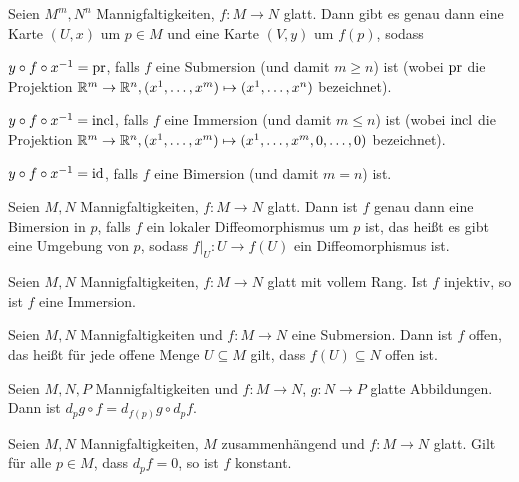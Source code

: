 \begin{korollar}[Normalformensatz]
  Seien $M^m,N^n$ Mannigfaltigkeiten, $f\colon M \to N$ glatt. Dann gibt
  es genau dann eine Karte $(U,x)$ um $p\in M$ und eine Karte $(V,y)$ um $f(p)$, sodass
  \begin{statements}
  \item $y\circ f\circ x^{-1} = \operatorname{pr}$, falls $f$ eine Submersion (und
    damit $m\geq n$) ist
    (wobei $\operatorname{pr}$ die Projektion $\mathbb{R}^m\to\mathbb{R}^n, (x^1,\dots,x^m) \mapsto
    (x^1,\dots,x^n)$ bezeichnet).
  \item $y\circ f\circ x^{-1} = \operatorname{incl}$, falls $f$ eine Immersion (und
    damit $m\leq n$) ist
    (wobei $\operatorname{incl}$ die Projektion $\mathbb{R}^m\to\mathbb{R}^n, (x^1,\dots,x^m) \mapsto
    (x^1,\dots,x^m,0,\dots,0)$ bezeichnet).
  \item $y\circ f\circ x^{-1} = \operatorname{id}$, falls $f$ eine Bimersion (und
    damit $m = n$) ist.
  \end{statements}
\end{korollar}

\begin{korollar}[Umkehrsatz]
  Seien $M,N$ Mannigfaltigkeiten, $f\colon M \to N$ glatt. Dann ist
  $f$ genau dann eine Bimersion in $p$, falls $f$ ein lokaler
  Diffeomorphismus um $p$ ist, das heißt es gibt eine Umgebung von
  $p$, sodass $f|_U\colon U \to f(U)$ ein Diffeomorphismus ist. 
\end{korollar}

\begin{proposition}
  Seien $M,N$ Mannigfaltigkeiten, $f\colon M \to N$ glatt mit vollem
  Rang. Ist $f$ injektiv, so ist $f$ eine Immersion.
\end{proposition}

\begin{proposition}
  Seien $M,N$ Mannigfaltigkeiten und $f\colon M \to N$ eine
  Submersion. Dann ist $f$ offen, das heißt für jede offene Menge
  $U\subseteq M$ gilt, dass $f(U) \subseteq N$ offen ist.
\end{proposition}

\begin{proposition}
  Seien $M,N,P$ Mannigfaltigkeiten und $f\colon M\to N$, $g\colon N
  \to P$ glatte Abbildungen. Dann ist $d_p g\circ f = d_{f(p)}g \circ d_pf$.
\end{proposition}

\begin{proposition}
  Seien $M,N$ Mannigfaltigkeiten, $M$ zusammenhängend und $f\colon M
  \to N$ glatt. Gilt für
  alle $p\in M$, dass $d_pf = 0$, so ist $f$ konstant. 
\end{proposition}


